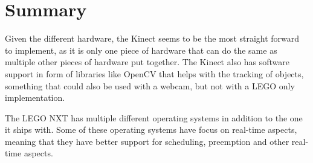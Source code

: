 \section{Summary}
Given the different hardware, the Kinect seems to be the most straight forward to implement, as it is only one piece of hardware that can do the same as multiple other pieces of hardware put together. The Kinect also has software support in form of libraries like OpenCV that helps with the tracking of objects, something that could also be used with a webcam, but not with a LEGO only implementation.

The LEGO NXT has multiple different operating systems in addition to the one it ships with. Some of these operating systems have focus on real-time aspects, meaning that they have better support for scheduling, preemption and other real-time aspects.